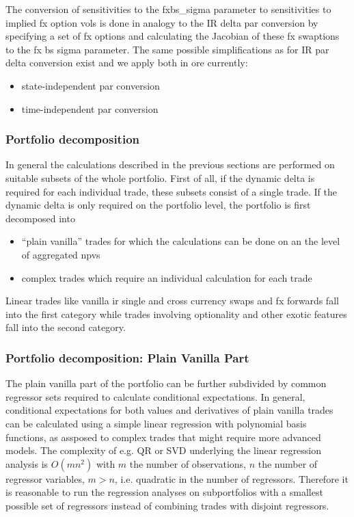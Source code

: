 The conversion of sensitivities to the fxbs\_sigma parameter to sensitivities to implied fx option vols is done in
analogy to the IR delta par conversion by specifying a set of fx options and calculating the Jacobian of these fx
swaptions to the fx bs sigma parameter. The same possible simplifications as for IR par delta conversion exist and we
apply both in ore currently:

\begin{itemize}
\item state-independent par conversion
\item time-independent par conversion
\end{itemize}

\subsubsection{Portfolio decomposition}\label{aad:dynamic_delta_subportfolios}

In general the calculations described in the previous sections are performed on suitable subsets of the whole
portfolio. First of all, if the dynamic delta is required for each individual trade, these subsets consist of a single
trade. If the dynamic delta is only required on the portfolio level, the portfolio is first decomposed into

\begin{itemize}
\item ``plain vanilla'' trades for which the calculations can be done on an the level of aggregated npvs
\item complex trades which require an individual calculation for each trade
\end{itemize}

Linear trades like vanilla ir single and cross currency swaps and fx forwards fall into the first category while trades
involving optionality and other exotic features fall into the second category.

\subsubsection{Portfolio decomposition: Plain Vanilla Part}

The plain vanilla part of the portfolio can be further subdivided by common regressor sets required to calculate
conditional expectations. In general, conditional expectations for both values and derivatives of plain vanilla trades
can be calculated using a simple linear regression with polynomial basis functions, as assposed to complex trades that
might require more advanced models. The complexity of e.g. QR or SVD underlying the linear regression analysis is
$O(mn^2)$ with $m$ the number of observations, $n$ the number of regressor variables, $m > n$, i.e. quadratic in the
number of regressors. Therefore it is reasonable to run the regression analyses on subportfolios with a smallest
possible set of regressors instead of combining trades with disjoint regressors.
